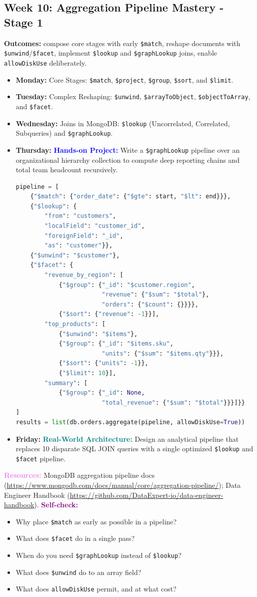 \documentclass[11pt, a4paper]{article}
\newcommand{\project}[1]{\textbf{\textcolor{blue}{Hands-on Project:}} #1}
\newcommand{\usecase}[1]{\textbf{\textcolor{teal}{Real-World Architecture:}} #1}
\newcommand{\dayitem}[2]{\item \textbf{#1:} #2}
\newcommand{\selfcheck}[1]{\vspace{1mm}\noindent\textbf{\textcolor{purple}{Self-check:}} #1}
\newcommand{\resources}[1]{\vspace{1mm}\noindent\textbf{\textcolor{violet}{Resources:}} #1}
\begin{document}
\subsection*{Week 10: Aggregation Pipeline Mastery - Stage 1}
\par\noindent\textbf{Outcomes:} compose core stages with early \texttt{\$match}, reshape documents with \texttt{\$unwind}/\texttt{\$facet}, implement \texttt{\$lookup} and \texttt{\$graphLookup} joins, enable \texttt{allowDiskUse} deliberately.
\begin{itemize}[label=-]
    \dayitem{Monday}{Core Stages: \texttt{\$match}, \texttt{\$project}, \texttt{\$group}, \texttt{\$sort}, and \texttt{\$limit}.}
    \dayitem{Tuesday}{Complex Reshaping: \texttt{\$unwind}, \texttt{\$arrayToObject}, \texttt{\$objectToArray}, and \texttt{\$facet}.}
    \dayitem{Wednesday}{Joins in MongoDB: \texttt{\$lookup} (Uncorrelated, Correlated, Subqueries) and \texttt{\$graphLookup}.}
    \dayitem{Thursday}{\project{Write a \texttt{\$graphLookup} pipeline over an organizational hierarchy collection to compute deep reporting chains and total team headcount recursively.}}
\begin{lstlisting}[language=Python]
pipeline = [
    {"$match": {"order_date": {"$gte": start, "$lt": end}}},
    {"$lookup": {
        "from": "customers",
        "localField": "customer_id",
        "foreignField": "_id",
        "as": "customer"}},
    {"$unwind": "$customer"},
    {"$facet": {
        "revenue_by_region": [
            {"$group": {"_id": "$customer.region",
                        "revenue": {"$sum": "$total"},
                        "orders": {"$count": {}}}},
            {"$sort": {"revenue": -1}}],
        "top_products": [
            {"$unwind": "$items"},
            {"$group": {"_id": "$items.sku",
                        "units": {"$sum": "$items.qty"}}},
            {"$sort": {"units": -1}},
            {"$limit": 10}],
        "summary": [
            {"$group": {"_id": None,
                        "total_revenue": {"$sum": "$total"}}}]}}
]
results = list(db.orders.aggregate(pipeline, allowDiskUse=True))
\end{lstlisting}
    \dayitem{Friday}{\usecase{Design an analytical pipeline that replaces 10 disparate SQL JOIN queries with a single optimized \texttt{\$lookup} and \texttt{\$facet} pipeline.}}
\end{itemize}
\resources{MongoDB aggregation pipeline docs (\url{https://www.mongodb.com/docs/manual/core/aggregation-pipeline/}); Data Engineer Handbook (\url{https://github.com/DataExpert-io/data-engineer-handbook}).}
\selfcheck{\begin{itemize}[label=-, itemsep=0pt, leftmargin=1.5em]
    \item Why place \texttt{\$match} as early as possible in a pipeline?
    \item What does \texttt{\$facet} do in a single pass?
    \item When do you need \texttt{\$graphLookup} instead of \texttt{\$lookup}?
    \item What does \texttt{\$unwind} do to an array field?
    \item What does \texttt{allowDiskUse} permit, and at what cost?
\end{itemize}}
\end{document}
